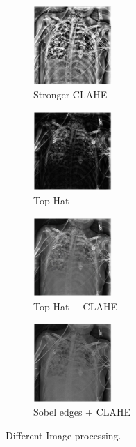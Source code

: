 \documentclass[journal, a4paper]{IEEEtran}
\begin{document}
\begin{figure}[H]
	\centering
	\begin{subfigure}[c]{.4\linewidth}
		\centering
		\includegraphics[width=3cm]{images/clahe2.png}
		\caption{Stronger CLAHE}
		\label{fig:Stronger CLAHE}
	\end{subfigure}\hspace{12pt}
	\begin{subfigure}[c]{.4\linewidth}
		\centering
		\includegraphics[width=3cm]{images/th.png}
		\caption{Top Hat}
		\label{fig:tophat}
	\end{subfigure}\vspace{12pt}
	\begin{subfigure}[c]{.4\linewidth}
		\centering
		\includegraphics[width=3cm]{images/thcl.png}
		\caption{Top Hat + CLAHE}
		\label{fig:tophatclahe}
	\end{subfigure}\hspace{12pt}
	\begin{subfigure}[c]{.4\linewidth}
		\centering
		\includegraphics[width=3cm]{images/sobel.png}
		\caption{Sobel edges + CLAHE}
		\label{fig:sobel}
	\end{subfigure}
	\caption{Different Image processing.}
	\label{fig:imageproc}
\end{figure}
\end{document}
